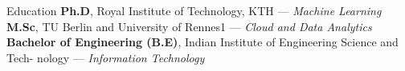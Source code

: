 \begin{rubric}{Education}
\entry*[2020 -- 2024]%
	\textbf{Ph.D}, Royal Institute of Technology, KTH — \emph{Machine Learning}
%
\entry*[2015 -- 2017]%
	\textbf{M.Sc}, TU Berlin and University of Rennes1 — \emph{Cloud and Data Analytics}
%
\entry*[2008 -- 2012]%
	\textbf{Bachelor of Engineering (B.E)}, Indian Institute of Engineering Science and Tech- nology — \emph{Information Technology}
%
\end{rubric}

